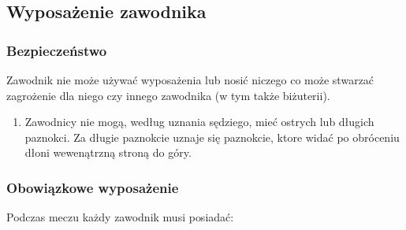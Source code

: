 \documentclass[12pt]{article}
\begin{document}
\subsection{Wyposażenie zawodnika}

\subsubsection{Bezpieczeństwo}
Zawodnik nie może używać wyposażenia lub
nosić niczego co może stwarzać zagrożenie dla niego czy innego zawodnika
(w tym także biżuterii).

\begin{enumerate}
	\item
	      Zawodnicy nie mogą, według uznania sędziego, mieć ostrych lub długich
	      paznokci. Za długie paznokcie uznaje się paznokcie, ktore widać po
	      obróceniu dłoni wewenątrzną stroną do góry.
\end{enumerate}

\subsubsection{Obowiązkowe wyposażenie}
Podczas meczu każdy zawodnik
musi posiadać:
\end{document}
